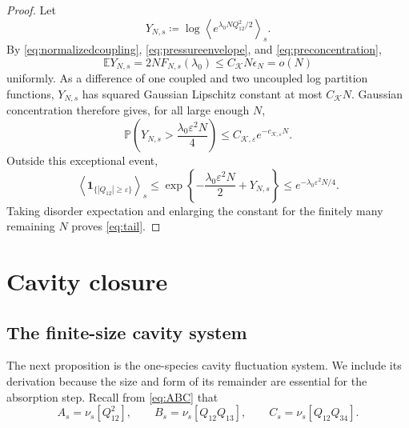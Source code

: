 \documentclass[11pt]{article}
\numberwithin{equation}{section}
\newcommand{\E}{\mathbb{E}}
\newcommand{\1}{\mathbf 1}
\newcommand{\cK}{\mathcal K}
\newcommand{\braket}[1]{\left\langle #1\right\rangle}
\begin{document}
\begin{proof}
Let
\[
 Y_{N,s}
 \coloneqq\log\braket{e^{\lambda_0NQ_{12}^2/2}}_s.
\]
By \eqref{eq:normalizedcoupling},
\eqref{eq:pressureenvelope}, and
\eqref{eq:preconcentration},
\[
 \E Y_{N,s}=2NF_{N,s}(\lambda_0)
 \le C_{\cK}N\epsilon_N=o(N)
\]
uniformly.  As a difference of one coupled and two uncoupled log
partition functions, $Y_{N,s}$ has squared Gaussian Lipschitz constant
at most $C_{\cK}N$.  Gaussian concentration therefore gives, for all
large enough $N$,
\[
 \mathbb P\left(
 Y_{N,s}>\frac{\lambda_0\varepsilon^2N}{4}\right)
 \le C_{\cK,\varepsilon}e^{-c_{\cK,\varepsilon}N}.
\]
Outside this exceptional event,
\[
 \braket{\1_{\{|Q_{12}|\ge\varepsilon\}}}_s
 \le
 \exp\left\{-\frac{\lambda_0\varepsilon^2N}{2}
 +Y_{N,s}\right\}
 \le e^{-\lambda_0\varepsilon^2N/4}.
\]
Taking disorder expectation and enlarging the constant for the
finitely many remaining $N$ proves \eqref{eq:tail}.
\end{proof}

\section{Cavity closure}\label{sec:cavityclosure}

\subsection{The finite-size cavity system}\label{subsec:cavity}

The next proposition is the one-species cavity fluctuation system.  We
include its derivation because the size and form of its remainder are
essential for the absorption step.
Recall from \eqref{eq:ABC} that
\[
 A_s=\nu_s[Q_{12}^2],\qquad
 B_s=\nu_s[Q_{12}Q_{13}],\qquad
 C_s=\nu_s[Q_{12}Q_{34}].
\]
\end{document}
